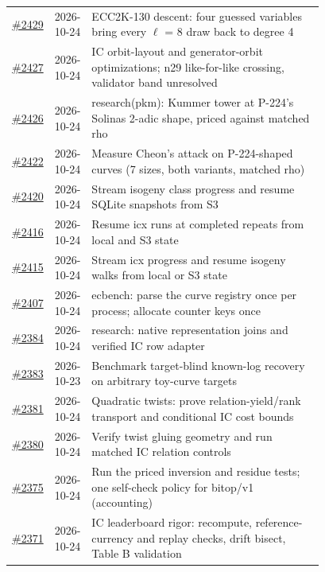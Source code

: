 {\begin{longtable}{@{}r l >{\raggedright\arraybackslash}p{0.78\linewidth}@{}}
\href{https://github.com/aburan28/crypto/pull/2429}{\#2429} & 2026-10-24 & ECC2K-130 descent: four guessed variables bring every $\ell$ = 8 draw back to degree 4\\
\href{https://github.com/aburan28/crypto/pull/2427}{\#2427} & 2026-10-24 & IC orbit-layout and generator-orbit optimizations; n29 like-for-like crossing, validator band unresolved\\
\href{https://github.com/aburan28/crypto/pull/2426}{\#2426} & 2026-10-24 & research(pkm): Kummer tower at P-224's Solinas 2-adic shape, priced against matched rho\\
\href{https://github.com/aburan28/crypto/pull/2422}{\#2422} & 2026-10-24 & Measure Cheon's attack on P-224-shaped curves (7 sizes, both variants, matched rho)\\
\href{https://github.com/aburan28/crypto/pull/2420}{\#2420} & 2026-10-24 & Stream isogeny class progress and resume SQLite snapshots from S3\\
\href{https://github.com/aburan28/crypto/pull/2416}{\#2416} & 2026-10-24 & Resume icx runs at completed repeats from local and S3 state\\
\href{https://github.com/aburan28/crypto/pull/2415}{\#2415} & 2026-10-24 & Stream icx progress and resume isogeny walks from local or S3 state\\
\href{https://github.com/aburan28/crypto/pull/2407}{\#2407} & 2026-10-24 & ecbench: parse the curve registry once per process; allocate counter keys once\\
\href{https://github.com/aburan28/crypto/pull/2384}{\#2384} & 2026-10-24 & research: native representation joins and verified IC row adapter\\
\href{https://github.com/aburan28/crypto/pull/2383}{\#2383} & 2026-10-23 & Benchmark target-blind known-log recovery on arbitrary toy-curve targets\\
\href{https://github.com/aburan28/crypto/pull/2381}{\#2381} & 2026-10-24 & Quadratic twists: prove relation-yield/\allowbreak{}rank transport and conditional IC cost bounds\\
\href{https://github.com/aburan28/crypto/pull/2380}{\#2380} & 2026-10-24 & Verify twist gluing geometry and run matched IC relation controls\\
\href{https://github.com/aburan28/crypto/pull/2375}{\#2375} & 2026-10-24 & Run the priced inversion and residue tests; one self-check policy for bitop/\allowbreak{}v1 (accounting)\\
\href{https://github.com/aburan28/crypto/pull/2371}{\#2371} & 2026-10-24 & IC leaderboard rigor: recompute, reference-currency and replay checks, drift bisect, Table B validation\\

\end{longtable}}
